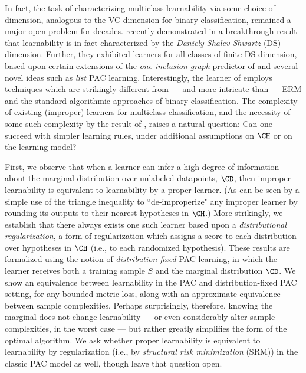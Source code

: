 \documentclass[11pt]{article}
\begin{document}
In fact, the task of characterizing multiclass learnability via some choice of dimension, analogous to the VC dimension for binary classification, remained a major open problem for decades. \citet{brukhim2022characterization} recently demonstrated in a breakthrough result that learnability is in fact characterized by the \emph{Daniely-Shalev-Shwartz} (DS) dimension. Further, they exhibited learners for all classes of finite DS dimension, based upon certain extensions of the \emph{one-inclusion graph} predictor of \citet{haussler1994predicting} and several novel ideas such as \emph{list} PAC learning. Interestingly, the learner of \citet{brukhim2022characterization} employs techniques which are strikingly different from --- and more intricate than --- ERM and the standard algorithmic approaches of binary classification. The complexity of existing (improper) learners for multiclass classification, and the necessity of some such complexity by the result of \citet{DS14}, raises a natural question: Can one succeed with simpler learning rules, under additional assumptions on $\CH$ or on the learning model? 

First, we observe that when a learner can infer a high degree of information about the marginal distribution over unlabeled datapoints, $\CD$, then improper learnability is equivalent to learnability by a proper learner. (As can be seen by a simple use of the triangle inequality to ``de-improperize" any improper learner by rounding its outputs to their nearest hypotheses in $\CH$.) More strikingly, we
establish that there always exists one such learner based upon a \emph{distributional regularization}, a form of regularization which assigns a score to each distribution over hypotheses in $\CH$ (i.e., to each randomized hypothesis). These results are formalized using the notion of \emph{distribution-fixed} PAC learning, in which the learner receives both a training sample $S$ and the marginal distribution $\CD$. We show an equivalence between learnability in the PAC and distribution-fixed PAC setting, for any bounded metric loss, along with an approximate equivalence between sample complexities. Perhaps surprisingly, therefore, knowing the marginal does not change learnability --- or even considerably alter sample complexities, in the worst case --- but rather greatly simplifies the form of the optimal algorithm. We ask whether proper learnability is equivalent to learnability by regularization (i.e., by \emph{structural risk minimization} (SRM)) in the classic PAC model as well, though leave that question open.
\end{document}
